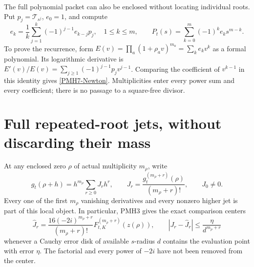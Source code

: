 \documentclass[11pt]{article}
\begin{document}
The full polynomial packet can also be enclosed without locating
individual roots. Put $p_j=\mathscr T_{s^j}$, $e_0=1$, and compute
\begin{equation}\label{PMH7-Newton}
 e_k=\frac1k\sum_{j=1}^k(-1)^{j-1}e_{k-j}p_j,
 \quad 1\le k\le m,\qquad
 P_t(s)=\sum_{k=0}^m(-1)^ke_ks^{m-k}.
\end{equation}
To prove the recurrence, form
$E(v)=\prod_a(1+\rho_av)^{m_a}=\sum_ke_kv^k$ as a formal
polynomial. Its logarithmic derivative is
$E'(v)/E(v)=\sum_{j\ge1}(-1)^{j-1}p_jv^{j-1}$.
Comparing the coefficient of $v^{k-1}$ in this identity gives
\eqref{PMH7-Newton}. Multiplicities enter every power sum and every
coefficient; there is no passage to a square-free divisor.

\section{Full repeated-root jets, without discarding their mass}

At any enclosed zero $\rho$ of actual multiplicity $m_\rho$, write
\begin{equation}\label{PMH8-local}
 g_t(\rho+h)=h^{m_\rho}\sum_{r\ge0}J_rh^r,
 \qquad J_r=\frac{g_t^{(m_\rho+r)}(\rho)}{(m_\rho+r)!},
 \qquad J_0\ne0.
\end{equation}
Every one of the first $m_\rho$ vanishing derivatives and every
nonzero higher jet is part of this local object. In particular,
PMH3 gives the exact comparison centers
\begin{equation}\label{PMH8-jets}
 \widehat J_r=
 \frac{16(-2i)^{m_\rho+r}}{(m_\rho+r)!}
 F_{t,K}^{(m_\rho+r)}(z(\rho)),\qquad
 |J_r-\widehat J_r|\le\frac{\eta}{d^{m_\rho+r}}
\end{equation}
whenever a Cauchy error disk of available $s$-radius $d$ contains
the evaluation point with error $\eta$. The factorial and every
power of $-2i$ have not been removed from the center.
\end{document}
